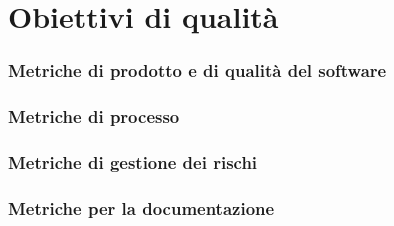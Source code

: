 \section{Obiettivi di qualità}

\subsubsection{Metriche di prodotto e di qualità del software}


\subsubsection{Metriche di processo}


\subsubsection{Metriche di gestione dei rischi}


\subsubsection{Metriche per la documentazione}

